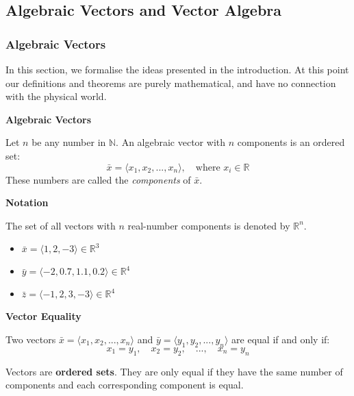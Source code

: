 \subsection{Algebraic Vectors and Vector Algebra}

\subsubsection{Algebraic Vectors}


In this section, we formalise the ideas presented in the introduction.
At this point our definitions and theorems are purely mathematical, and have no connection
with the physical world.

\begin{definitionbox}
\textbf{Algebraic Vectors}

Let $n$ be any number in $\mathbb{N}$. An algebraic vector with $n$ components is an ordered set:
\[
\bar{x} = \langle x_1, x_2, ..., x_n \rangle, \quad \text{where } x_i \in \mathbb{R}
\]
These numbers are called the \textit{components} of $\bar{x}$.
\end{definitionbox}

\begin{definitionbox}
\textbf{Notation}

The set of all vectors with $n$ real-number components is denoted by $\mathbb{R}^n$.
\end{definitionbox}

\begin{examplebox}
\begin{itemize}
\item $\bar{x} = \langle 1, 2, -3 \rangle \in \mathbb{R}^3$
\item $\bar{y} = \langle -2, 0.7, 1.1, 0.2 \rangle \in \mathbb{R}^4$
\item $\bar{z} = \langle -1, 2, 3, -3 \rangle \in \mathbb{R}^4$
\end{itemize}
\end{examplebox}

\begin{definitionbox}
\textbf{Vector Equality}

Two vectors $\bar{x} = \langle x_1, x_2, ..., x_n \rangle$ and $\bar{y} = \langle y_1, y_2, ..., y_n \rangle$ are equal if and only if:
\[
x_1 = y_1, \quad x_2 = y_2, \quad ..., \quad x_n = y_n
\]
\end{definitionbox}

\begin{remarkbox}
Vectors are \textbf{ordered sets}. They are only equal if they have the same number of components and each corresponding component is equal.
\end{remarkbox}

